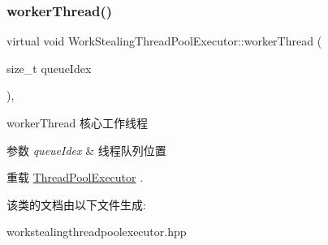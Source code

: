 \subsubsection{\texorpdfstring{worker\+Thread()}{workerThread()}}
{\footnotesize\ttfamily virtual void Work\+Stealing\+Thread\+Pool\+Executor\+::worker\+Thread (\begin{DoxyParamCaption}\item[{size\+\_\+t}]{queue\+Idex }\end{DoxyParamCaption})\hspace{0.3cm}{\ttfamily [override]}, {\ttfamily [virtual]}}



worker\+Thread 核心工作线程 


\begin{DoxyParams}{参数}
{\em queue\+Idex} & 线程队列位置 \\
\hline
\end{DoxyParams}


重载 \hyperlink{classThreadPoolExecutor_a844902ce61fb16b11a569b8ee56e80e9}{Thread\+Pool\+Executor} .



该类的文档由以下文件生成\+:\begin{DoxyCompactItemize}
\item 
workstealingthreadpoolexecutor.\+hpp\end{DoxyCompactItemize}
